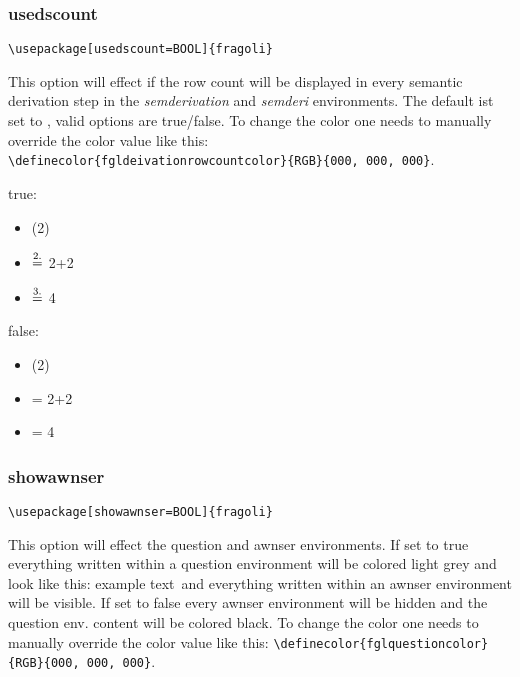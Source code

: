 \documentclass[10pt, a4paper]{article}
\newenvironment{itemizeexample}{
	\begin{itemize}
		\setlength\itemsep{-.5em}
	}
	{
	\end{itemize}
}
\begin{document}
	\subsubsection{usedscount}
	\begin{lstlisting}[style=A]
			\usepackage[usedscount=BOOL]{fragoli}
	\end{lstlisting}
	This option will effect if the row count will be displayed in every semantic derivation step in the \textit{semderivation} and \textit{semderi} environments. The default ist set to \texttt{}, valid options are true/false. To change the color one needs to manually override the color value like this: \\\verb=\definecolor{fgldeivationrowcountcolor}{RGB}{000, 000, 000}=.
	\begin{center}
		\begin{minipage}[h][2cm][t]{15em}
			true:\begin{itemizeexample}
				\item[] (2)
				\item[$\stackrel{\color{fgldeivationrowcountcolor}2.\color{black}}{=}$] 2+2
				\item[$\stackrel{\color{fgldeivationrowcountcolor}3.\color{black}}{=}$] 4
			\end{itemizeexample}
		\end{minipage}
		\begin{minipage}[h][2cm][t]{15em}
			false:\begin{itemizeexample}
				\item[] (2)
				\item[=] 2+2
				\item[=] 4
			\end{itemizeexample}
		\end{minipage}
	\end{center}
	\subsubsection{showawnser}
	\begin{lstlisting}[style=A]
			\usepackage[showawnser=BOOL]{fragoli}
	\end{lstlisting}
	This option will effect the question and awnser environments. If set to true everything written within a question environment will be colored light grey and look like this: \color{fglquestioncolor}example text\color{black}\ and everything written within an awnser environment will be visible. If set to false every awnser environment will be hidden and the question env. content will be colored black. To change the color one needs to manually override the color value like this: \verb=\definecolor{fglquestioncolor}{RGB}{000, 000, 000}=.
\end{document}

